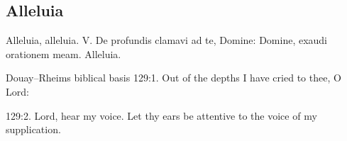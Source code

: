\subsection{Alleluia}
\label{proper-alleluia}
\begin{latinproper}
Alleluia, alleluia. V. De profundis clamavi ad te, Domine: Domine, exaudi orationem meam. Alleluia.
\end{latinproper}
\begin{englishwitness}{Douay--Rheims biblical basis}
129:1. Out of the depths I have cried to thee, O Lord:

129:2. Lord, hear my voice. Let thy ears be attentive to the voice of
my supplication.
\end{englishwitness}

